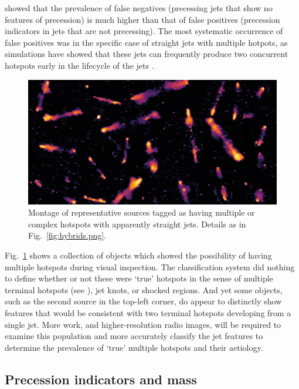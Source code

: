 \documentclass{aa}
\begin{document}
\cite{horton20b} showed that the prevalence of false negatives (precessing jets that show no features of precession) is much higher than that of false positives (precession indicators in jets that are not precessing). The most systematic occurrence of false positives was in the specific case of straight jets with multiple hotpots, as simulations have showed that these jets can frequently produce two concurrent hotspots early in the lifecycle of the jets \citep{horton23}. 

\begin{figure}
\includegraphics[width=1\linewidth]{Images/galaxies/straight-multi.png}
\caption{Montage of representative sources tagged as having multiple or complex hotspots with apparently straight jets. Details as in Fig.\ \ref{fig:hybrids.png}.}
\label{fig:straight-multi.png}
\end{figure}

Fig.~\ref{fig:straight-multi.png} shows a collection of objects which showed the possibility of having multiple hotspots during visual inspection. The classification system did nothing to define whether or not these were `true' hotspots in the sense of multiple terminal hotspots (see \cite{horton23}), jet knots, or shocked regions. And yet some objects, such as the second source in the top-left corner, do appear to distinctly show features that would be consistent with two terminal hotspots developing from a single jet. More work, and higher-resolution radio images, will be required to examine this population and more accurately classify the jet features to determine the prevalence of `true' multiple hotspots and their aetiology. 

\subsection{Precession indicators and mass}
\end{document}
